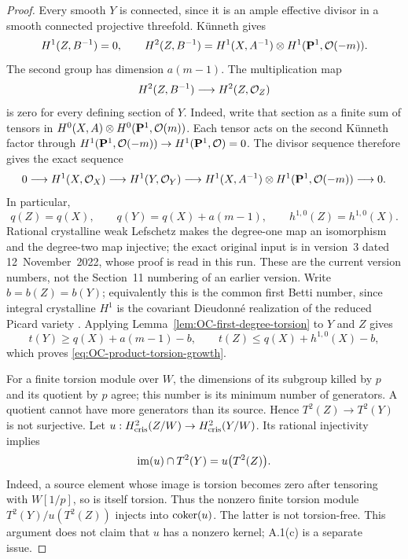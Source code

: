 \begin{proof}
Every smooth $Y$ is connected, since it is an ample effective divisor in a smooth connected projective threefold.  K\"unneth gives
\[
 H^1(Z,B^{-1})=0,
 \qquad
 H^2(Z,B^{-1})=
 H^1(X,A^{-1})\otimes H^1(\mathbf P^1,\mathcal O(-m)).
\]
The second group has dimension $a(m-1)$.
The multiplication map
\[
                        H^2(Z,B^{-1})\longrightarrow H^2(Z,\mathcal O_Z)
\]
is zero for every defining section of $Y$.  Indeed, write that section as a finite sum of tensors in
$H^0(X,A)\otimes H^0(\mathbf P^1,\mathcal O(m))$.
Each tensor acts on the second K\"unneth factor through
$H^1(\mathbf P^1,\mathcal O(-m))\to H^1(\mathbf P^1,\mathcal O)=0$.
The divisor sequence therefore gives the exact sequence
\[
 0\longrightarrow H^1(X,\mathcal O_X)\longrightarrow H^1(Y,\mathcal O_Y)
   \longrightarrow H^1(X,A^{-1})\otimes H^1(\mathbf P^1,\mathcal O(-m))
   \longrightarrow0.
\]
In particular,
\[
 q(Z)=q(X),\qquad q(Y)=q(X)+a(m-1),\qquad
 h^{1,0}(Z)=h^{1,0}(X).
\]
Rational crystalline weak Lefschetz makes the degree-one map an isomorphism and the degree-two map injective; the exact original input is \cite[Appendix, Section~9, Theorem~9.1 and Corollary~9.3, pp.~63--64]{NakkajimaYobuko2022} in version~3 dated 12~November~2022, whose proof is read in this run.  These are the current version numbers, not the Section~11 numbering of an earlier version.  Write
$b=b(Z)=b(Y)$; equivalently this is the common first Betti number, since integral crystalline $H^1$ is the covariant Dieudonn\'e realization of the reduced Picard variety
\cite[II, Proposition~3.11 and Remark~3.11.2, pp.~618--619]{Illusie1979DRW}.
Applying Lemma~\ref{lem:OC-first-degree-torsion} to $Y$ and $Z$ gives
\[
 t(Y)\geq q(X)+a(m-1)-b,
 \qquad t(Z)\leq q(X)+h^{1,0}(X)-b,
\]
which proves \eqref{eq:OC-product-torsion-growth}.

For a finite torsion module over $W$, the dimensions of its subgroup killed by $p$ and its quotient by $p$ agree; this number is its minimum number of generators.  A quotient cannot have more generators than its source.  Hence $T^2(Z)\to T^2(Y)$ is not surjective.
Let $u:H^2_{\mathrm{cris}}(Z/W)\to H^2_{\mathrm{cris}}(Y/W)$.
Its rational injectivity implies
\[
            \operatorname{im}(u)\cap T^2(Y)=u\bigl(T^2(Z)\bigr).
\]
Indeed, a source element whose image is torsion becomes zero after tensoring with $W[1/p]$, so is itself torsion.
Thus the nonzero finite torsion module
$T^2(Y)/u(T^2(Z))$ injects into $\operatorname{coker}(u)$.
The latter is not torsion-free.  This argument does not claim that $u$ has a nonzero kernel; A.1(c) is a separate issue.
\end{proof}

